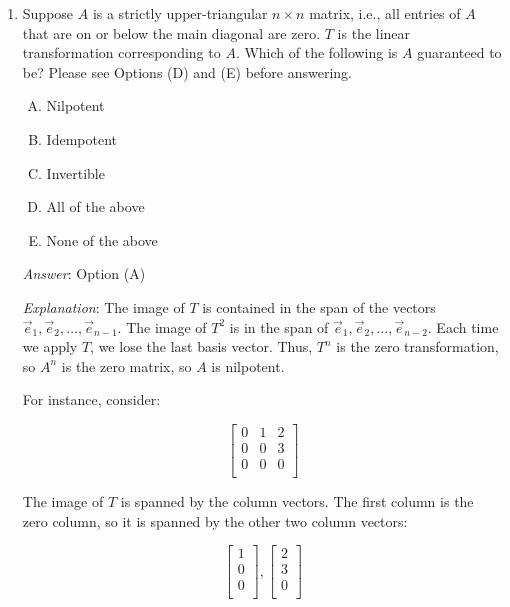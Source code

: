 \documentclass[10pt]{amsart}
\begin{document}
\begin{enumerate}
  {\em Historical note (last time)}: $5$ out of $24$ got this. $9$ chose (A),
  $6$ chose (E), $2$ each chose (B) and (D).

\item Suppose $A$ is a strictly upper-triangular $n \times n$ matrix,
  i.e., all entries of $A$ that are on or below the main diagonal are
  zero. $T$ is the linear transformation corresponding to $A$. Which
  of the following is $A$ guaranteed to be? Please see Options (D) and
  (E) before answering.

  \begin{enumerate}[(A)]
  \item Nilpotent
  \item Idempotent
  \item Invertible
  \item All of the above
  \item None of the above
  \end{enumerate}

  {\em Answer}: Option (A)

  {\em Explanation}: The image of $T$ is contained in the span of the
  vectors $\vec{e}_1, \vec{e}_2, \dots, \vec{e}_{n-1}$. The image of
  $T^2$ is in the span of
  $\vec{e}_1,\vec{e}_2,\dots,\vec{e}_{n-2}$. Each time we apply $T$,
  we lose the last basis vector. Thus, $T^n$ is the zero
  transformation, so $A^n$ is the zero matrix, so $A$ is nilpotent.

  For instance, consider:

  $$\left[\begin{matrix} 0 & 1 & 2 \\ 0 & 0 & 3 \\ 0 & 0 & 0 \\\end{matrix}\right]$$

  The image of $T$ is spanned by the column vectors. The first column
  is the zero column, so it is spanned by the other two column vectors:

  $$\left[\begin{matrix} 1 \\ 0 \\ 0 \\\end{matrix}\right], \left[\begin{matrix} 2 \\ 3 \\ 0 \\\end{matrix}\right]$$


\end{enumerate}
\end{document}
